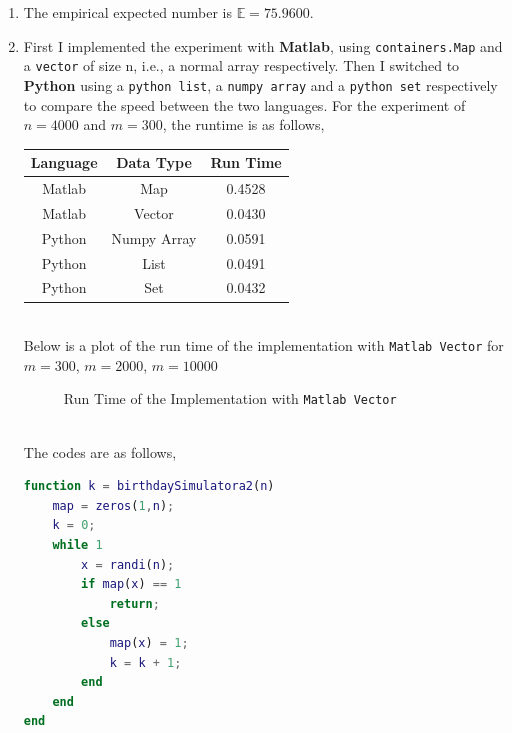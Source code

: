 \documentclass[11pt]{article}
\begin{document}
\begin{enumerate}[A]
\item The empirical expected number is $\mathbb{E} = 75.9600$.
\item First I implemented the experiment with \textbf{Matlab}, using \texttt{containers.Map} and a \texttt{vector} of size n, i.e., a normal array  respectively. Then I switched to \textbf{Python} using a \texttt{python list}, a \texttt{numpy array} and a \texttt{python set} respectively to compare the speed between the two languages.
For the experiment of $n=4000$ and $m=300$, the runtime is as follows,
\begin{table}[h]
\centering
\begin{tabular}{ccc}
Language & Data Type & Run Time\\
\hline
Matlab & Map & 0.4528\\
Matlab & Vector & 0.0430\\
Python & Numpy Array & 0.0591\\
Python & List & 0.0491\\
Python & Set & 0.0432\\
\end{tabular}
\end{table}\\
Below is a plot of the run time of the implementation with \texttt{Matlab Vector} for $m=300$, $m=2000$, $m=10000$\\
\begin{figure}[h]
\caption{Run Time of the Implementation with \texttt{Matlab Vector}}
\label{fig:name}
\end{figure}\\
The codes are as follows,
\begin{lstlisting}[language=Matlab]
function k = birthdaySimulatora2(n)
    map = zeros(1,n);
    k = 0;
    while 1
        x = randi(n);
        if map(x) == 1
            return;
        else
            map(x) = 1;
            k = k + 1;
        end
    end
end
\end{lstlisting}
\end{enumerate}
\end{document}
